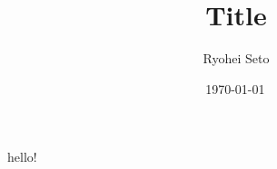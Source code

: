\documentclass[fontsize=11pt]{scrartcl}
\title{Title}
\date{\shortdate\today \, \ampmtime }
\author{Ryohei Seto}
\begin{document}
\maketitle

hello!


\end{document}
